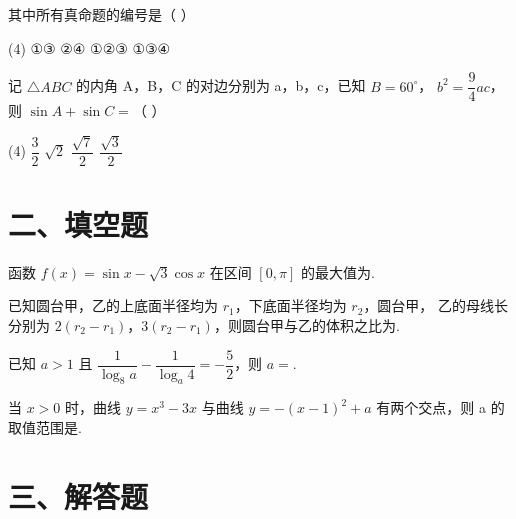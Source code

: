 \documentclass[UTF8,12pt]{ctexart}
\newcommand{\blank}{\underline{\hspace{4em}}}   %
\begin{document}
\begin{questions}
  其中所有真命题的编号是（ ）

    \begin{tasks}(4)
      \task ①③
      \task ②④
      \task ①②③
      \task ①③④
    \end{tasks}

  \item 记 $\triangle ABC$ 的内角 A，B，C 的对边分别为 a，b，c，已知 $B=60^\circ$，%
    $b^2=\dfrac94ac$，则 $\sin A+\sin C=$（ ）

    \begin{tasks}(4)
      \task $\dfrac32$
      \task $\sqrt2$
      \task $\dfrac{\sqrt7}{2}$
      \task $\dfrac{\sqrt3}{2}$
    \end{tasks}

\end{questions}

\section*{二、填空题}

\begin{questions}[start=13]

  \item 函数 $f(x)=\sin x-\sqrt3\cos x$ 在区间 $[0,\pi]$ 的最大值为\blank.

  \item 已知圆台甲，乙的上底面半径均为 $r_1$，下底面半径均为 $r_2$，圆台甲，
    乙的母线长分别为 $2(r_2-r_1)$，$3(r_2-r_1)$，则圆台甲与乙的体积之比为\blank.

  \item 已知 $a>1$ 且 $\dfrac{1}{\log_8a}-\dfrac{1}{\log_a4}=-\dfrac52$，则 $a=$\blank.

  \item 当 $x>0$ 时，曲线 $y=x^3-3x$ 与曲线 $y=-(x-1)^2+a$ 有两个交点，则 a
    的取值范围是\blank.

\end{questions}

\section*{三、解答题}
\end{document}
